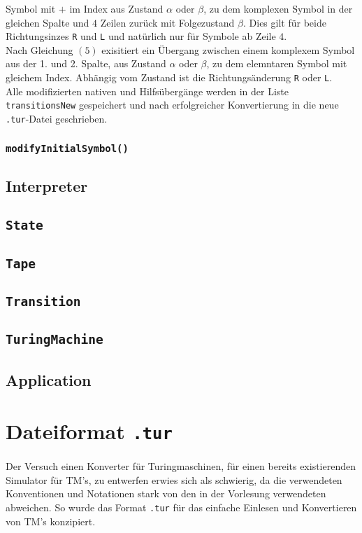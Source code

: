 \documentclass[10pt, a4paper]{article}
\newcommand{\ilc}{\texttt}
\begin{document}
Symbol mit $+$ im Index aus Zustand $\alpha$ oder $\beta$, zu dem komplexen
Symbol in der gleichen Spalte und $4$ Zeilen zurück mit Folgezustand $\beta$.
Dies gilt für beide Richtungsinzes \ilc{R} und \ilc{L} und natürlich nur für Symbole
ab Zeile $4$.\\
Nach Gleichung $(5)$ exisitiert ein Übergang zwischen einem komplexem
Symbol aus der 1. und 2. Spalte, aus Zustand $\alpha$ oder $\beta$, zu dem
elemntaren Symbol mit gleichem Index. Abhängig vom Zustand ist die
Richtungsänderung \ilc{R} oder \ilc{L}.\\
Alle modifizierten nativen und Hilfsübergänge werden in der Liste \ilc{transitionsNew} gespeichert und nach erfolgreicher Konvertierung in die neue \ilc{.tur}-Datei geschrieben.\par

\subsubsection*{\ilc{modifyInitialSymbol()}}


\subsection*{Interpreter}
\subsection*{\ilc{State}}
\subsection*{\ilc{Tape}}
\subsection*{\ilc{Transition}}
\subsection*{\ilc{TuringMachine}}

\subsection*{Application}


\section*{Dateiformat \ilc{.tur}}
\paragraph*{}
Der Versuch einen Konverter für Turingmaschinen, für einen bereits existierenden Simulator für TM's, zu entwerfen erwies sich als schwierig, da die verwendeten Konventionen und Notationen stark von den in der Vorlesung verwendeten abweichen. So wurde das Format \ilc{.tur} für das einfache Einlesen und Konvertieren von TM's konzipiert.
\end{document}
